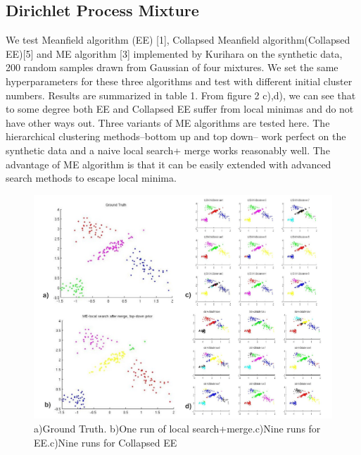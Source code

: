 \documentclass{article}
\begin{document}
\subsection{Dirichlet Process Mixture}
We test Meanfield algorithm (EE) [1], Collapsed Meanfield algorithm(Collapsed EE)[5] and ME algorithm [3] implemented by Kurihara on the synthetic data, 200 random samples drawn from Gaussian of four mixtures.
We set the same hyperparameters for these three algorithms and test with different initial cluster numbers.
Results are summarized in table 1. 
From figure 2 c),d), we can see that to some degree both EE and Collapsed EE suffer from local minimas and do not have other ways out.
Three variants of ME algorithms are tested here. The hierarchical clustering methods--bottom up and top down-- work perfect on the synthetic data and 
a naive local search+ merge works reasonably well.
The advantage of ME algorithm is that it can be easily extended with advanced search methods to escape local minima.
\begin{figure}[h] 
    \centering 
    \includegraphics[width=1.0\textwidth]{me_dp.pdf} 
    \caption{a)Ground Truth. b)One run of local search+merge.c)Nine runs for EE.c)Nine runs for Collapsed EE} 
    \label{fig:by:table} 
\end{figure}
\end{document}
